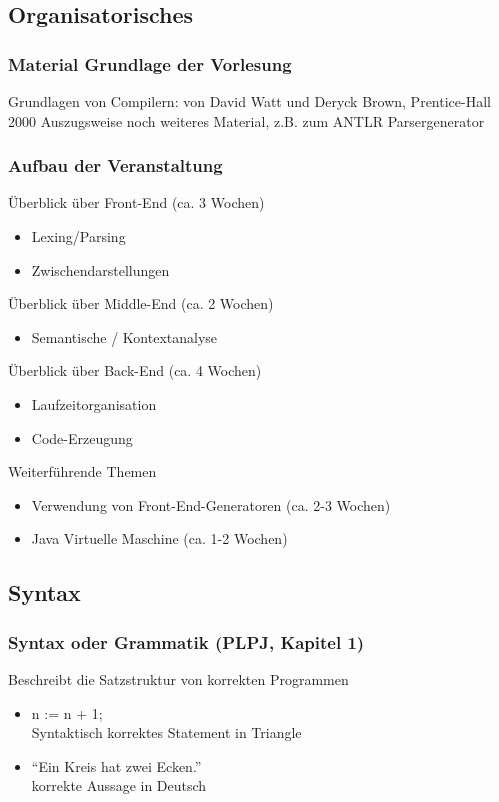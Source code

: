 \subsection{Organisatorisches}
\subsubsection*{Material Grundlage der Vorlesung}
Grundlagen von Compilern: 
 von David Watt und Deryck Brown, Prentice-Hall 2000
Auszugsweise noch weiteres Material, z.B. zum ANTLR Parsergenerator
\subsubsection*{Aufbau der Veranstaltung}
Überblick über Front-End (ca. 3 Wochen)
\begin{itemize}
	\item Lexing/Parsing
	\item Zwischendarstellungen
\end{itemize}
Überblick über Middle-End (ca. 2 Wochen)
\begin{itemize}
	\item Semantische / Kontextanalyse
\end{itemize}
Überblick über Back-End (ca. 4 Wochen)
\begin{itemize}
	\item Laufzeitorganisation
	\item Code-Erzeugung
\end{itemize}
Weiterführende Themen
\begin{itemize}
	\item Verwendung von Front-End-Generatoren (ca. 2-3 Wochen)
	\item Java Virtuelle Maschine (ca. 1-2 Wochen)
\end{itemize}
\subsection{Syntax}
\subsubsection*{Syntax oder Grammatik (PLPJ, Kapitel 1)}
\begin{grayInfoBox}
	Beschreibt die Satzstruktur von korrekten Programmen
	\begin{itemize}
		\item n := n + 1;\\
		Syntaktisch korrektes Statement in Triangle
		\item \enquote{Ein Kreis hat zwei Ecken.}\\
		 korrekte Aussage in Deutsch
	\end{itemize}
\end{grayInfoBox}

